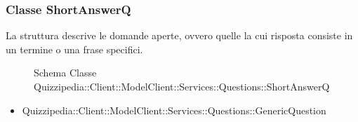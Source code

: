 \subsubsection{Classe ShortAnswerQ}
La struttura descrive le domande aperte, ovvero quelle la cui risposta consiste in un termine o una frase specifici.
\begin{figure}[H]
\centering
\noindent{}
\caption[Schema Classe ShortAnswerQ]{Schema Classe Quizzipedia::Client::ModelClient::Services::Questions::ShortAnswerQ}
\end{figure}
\begin{itemize}
\item Quizzipedia::Client::ModelClient::Services::Questions::GenericQuestion
\end{itemize}
